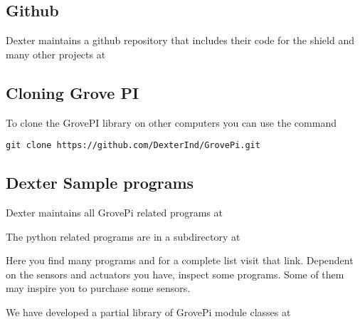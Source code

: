 
\subsection{Github}\label{github}

Dexter maintains a github repository that includes their code for the
shield and many other projects at


\subsection{Cloning Grove PI}\label{cloning-grove-pi}

To clone the GrovePI library on other computers you can use the command

\begin{verbatim}
git clone https://github.com/DexterInd/GrovePi.git
\end{verbatim}

\subsection{Dexter Sample programs}\label{dexter-sample-programs}

Dexter maintains all GrovePi related programs at


The python related programs are in a subdirectory at


Here you find many programs and for a complete list visit that link.
Dependent on the sensors and actuators you have, inspect some programs.
Some of them may inspire you to purchase some sensors.

We have developed a partial library of GrovePi module classes at

